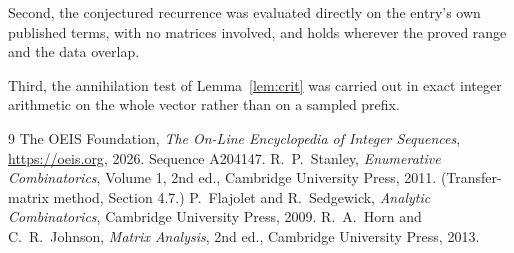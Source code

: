 \documentclass[11pt,a4paper]{article}
\theoremstyle{plain}
\theoremstyle{definition}
\begin{document}
Second, the conjectured recurrence was evaluated directly on the entry's own published terms,
with no matrices involved, and holds wherever the proved range and the data overlap.

Third, the annihilation test of Lemma~\ref{lem:crit} was carried out in exact integer
arithmetic on the whole vector rather than on a sampled prefix.

\begin{thebibliography}{9}
 The OEIS Foundation, \emph{The On-Line Encyclopedia of Integer
Sequences}, \url{https://oeis.org}, 2026. Sequence A204147.
 R.~P.~Stanley, \emph{Enumerative Combinatorics}, Volume 1, 2nd ed.,
Cambridge University Press, 2011. (Transfer-matrix method, Section 4.7.)
 P.~Flajolet and R.~Sedgewick, \emph{Analytic Combinatorics}, Cambridge
University Press, 2009.
 R.~A.~Horn and C.~R.~Johnson, \emph{Matrix Analysis}, 2nd ed., Cambridge
University Press, 2013.
\end{thebibliography}
\end{document}
